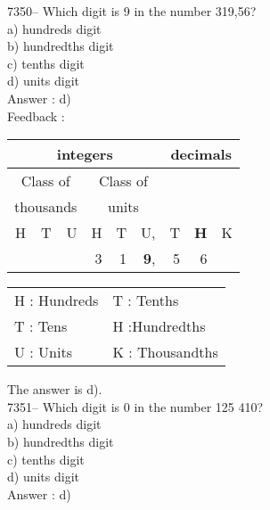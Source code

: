 \documentclass[letterpaper, 12pt]{article}
\begin{document}
7350-- Which digit is 9 in the number 319,56?\\

a) hundreds digit\\
b) hundredths digit\\
c) tenths digit\\
d) units digit\\

Answer : d)\\

Feedback :\\
\begin{center}
\begin{tabular}{|rrr|rrr|rrr|}
\hline
\multicolumn{6}{|c|}{integers} &\multicolumn{3}{|c|}{decimals} \\
\hline
\multicolumn{3}{|c|}{Class of} &\multicolumn{3}{|c|}{Class of} &  \multicolumn{3}{c|}{} \\
\multicolumn{3}{|c|}{thousands} &\multicolumn{3}{|c|}{units} &  \multicolumn{3}{c|}{} \\
\hline
H & T & U &H & T & U, & T\up{th} & \textbf{H\up{th}} & K\up{th} \\
\hline
\hline
 & & & 3 & 1 & \textbf{9}, & 5 & 6 & \\
\hline
\end{tabular}
\end{center}

\scriptsize
\begin{center}
\begin{tabular}{ll}
H : Hundreds & T\up{th} : Tenths\\
T : Tens & H\up{th} :Hundredths\\
U : Units & K\up{e} : Thousandths\\
\end{tabular}
\end{center}

\normalsize
The answer is d).\\

7351-- Which digit is 0 in the number 125 410?\\

a) hundreds digit\\
b) hundredths digit\\
c) tenths digit\\
d) units digit\\

Answer : d)\\
\end{document}
